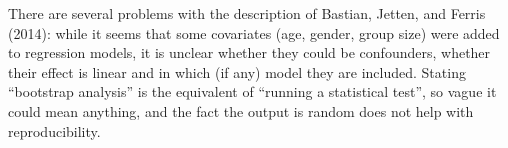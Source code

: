 \documentclass[
  11pt,
  letterpaper,
]{scrbook}
\theoremstyle{definition}
\theoremstyle{definition}
\theoremstyle{remark}
\begin{document}
\begin{tcolorbox}[enhanced jigsaw, bottomrule=.15mm, coltitle=black, colframe=quarto-callout-caution-color-frame, left=2mm, opacityback=0, breakable, opacitybacktitle=0.6, rightrule=.15mm, toprule=.15mm, title=\textcolor{quarto-callout-caution-color}{\faFire}\hspace{0.5em}{Pitfall}, toptitle=1mm, leftrule=.75mm, titlerule=0mm, colback=white, arc=.35mm, bottomtitle=1mm, colbacktitle=quarto-callout-caution-color!10!white]

There are several problems with the description of Bastian, Jetten, and
Ferris (2014): while it seems that some covariates (age, gender, group
size) were added to regression models, it is unclear whether they could
be confounders, whether their effect is linear and in which (if any)
model they are included. Stating ``bootstrap analysis'' is the
equivalent of ``running a statistical test'', so vague it could mean
anything, and the fact the output is random does not help with
reproducibility.

\end{tcolorbox}
\end{document}
